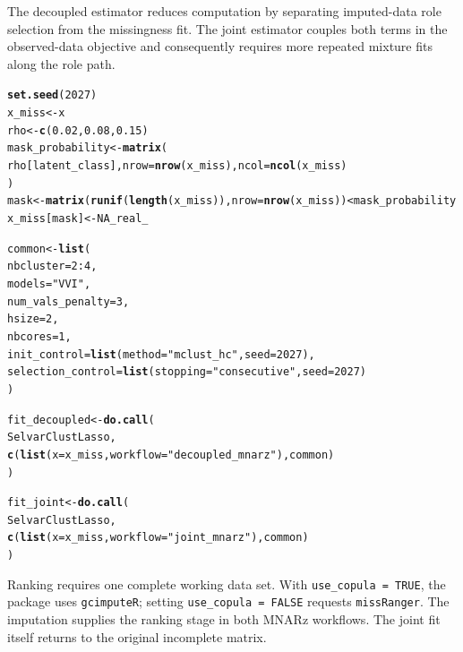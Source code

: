 \documentclass[10pt]{article}\usepackage[]{graphicx}\usepackage[]{xcolor}
\makeatletter
\newcommand{\hlnum}[1]{\textcolor[rgb]{0.686,0.059,0.569}{#1}}%
\newcommand{\hlsng}[1]{\textcolor[rgb]{0.192,0.494,0.8}{#1}}%
\newcommand{\hlopt}[1]{\textcolor[rgb]{0,0,0}{#1}}%
\newcommand{\hldef}[1]{\textcolor[rgb]{0.345,0.345,0.345}{#1}}%
\newcommand{\hlkwb}[1]{\textcolor[rgb]{0.69,0.353,0.396}{#1}}%
\newcommand{\hlkwc}[1]{\textcolor[rgb]{0.333,0.667,0.333}{#1}}%
\newcommand{\hlkwd}[1]{\textcolor[rgb]{0.737,0.353,0.396}{\textbf{#1}}}%
\newenvironment{kframe}{%
 \def\at@end@of@kframe{}%
 \ifinner\ifhmode%
  \def\at@end@of@kframe{\end{minipage}}%
  \begin{minipage}{\columnwidth}%
 \fi\fi%
 \def\FrameCommand##1{\hskip\@totalleftmargin \hskip-\fboxsep
 \colorbox{shadecolor}{##1}\hskip-\fboxsep
     \hskip-\linewidth \hskip-\@totalleftmargin \hskip\columnwidth}%
 \MakeFramed {\advance\hsize-\width
   \@totalleftmargin\z@ \linewidth\hsize
   \@setminipage}}%
 {\par\unskip\endMakeFramed%
 \at@end@of@kframe}
\newenvironment{knitrout}{}{} %
\makeatother
\begin{document}
The decoupled estimator reduces computation by separating imputed-data role
selection from the missingness fit. The joint estimator couples both terms in
the observed-data objective and consequently requires more repeated mixture
fits along the role path.

\begin{knitrout}
\color{fgcolor}\begin{kframe}
\begin{alltt}
\hlkwd{set.seed}\hldef{(}\hlnum{2027}\hldef{)}
\hldef{x_miss} \hlkwb{<-} \hldef{x}
\hldef{rho} \hlkwb{<-} \hlkwd{c}\hldef{(}\hlnum{0.02}\hldef{,} \hlnum{0.08}\hldef{,} \hlnum{0.15}\hldef{)}
\hldef{mask_probability} \hlkwb{<-} \hlkwd{matrix}\hldef{(}
 \hldef{rho[latent_class],} \hlkwc{nrow} \hldef{=} \hlkwd{nrow}\hldef{(x_miss),} \hlkwc{ncol} \hldef{=} \hlkwd{ncol}\hldef{(x_miss)}
\hldef{)}
\hldef{mask} \hlkwb{<-} \hlkwd{matrix}\hldef{(}\hlkwd{runif}\hldef{(}\hlkwd{length}\hldef{(x_miss)),} \hlkwc{nrow} \hldef{=} \hlkwd{nrow}\hldef{(x_miss))} \hlopt{<} \hldef{mask_probability}
\hldef{x_miss[mask]} \hlkwb{<-} \hlnum{NA_real_}

\hldef{common} \hlkwb{<-} \hlkwd{list}\hldef{(}
 \hlkwc{nbcluster} \hldef{=} \hlnum{2}\hlopt{:}\hlnum{4}\hldef{,}
 \hlkwc{models} \hldef{=} \hlsng{"VVI"}\hldef{,}
 \hlkwc{num_vals_penalty} \hldef{=} \hlnum{3}\hldef{,}
 \hlkwc{hsize} \hldef{=} \hlnum{2}\hldef{,}
 \hlkwc{nbcores} \hldef{=} \hlnum{1}\hldef{,}
 \hlkwc{init_control} \hldef{=} \hlkwd{list}\hldef{(}\hlkwc{method} \hldef{=} \hlsng{"mclust_hc"}\hldef{,} \hlkwc{seed} \hldef{=} \hlnum{2027}\hldef{),}
 \hlkwc{selection_control} \hldef{=} \hlkwd{list}\hldef{(}\hlkwc{stopping} \hldef{=} \hlsng{"consecutive"}\hldef{,} \hlkwc{seed} \hldef{=} \hlnum{2027}\hldef{)}
\hldef{)}

\hldef{fit_decoupled} \hlkwb{<-} \hlkwd{do.call}\hldef{(}
 \hldef{SelvarClustLasso,}
 \hlkwd{c}\hldef{(}\hlkwd{list}\hldef{(}\hlkwc{x} \hldef{= x_miss,} \hlkwc{workflow} \hldef{=} \hlsng{"decoupled_mnarz"}\hldef{), common)}
\hldef{)}

\hldef{fit_joint} \hlkwb{<-} \hlkwd{do.call}\hldef{(}
 \hldef{SelvarClustLasso,}
 \hlkwd{c}\hldef{(}\hlkwd{list}\hldef{(}\hlkwc{x} \hldef{= x_miss,} \hlkwc{workflow} \hldef{=} \hlsng{"joint_mnarz"}\hldef{), common)}
\hldef{)}
\end{alltt}
\end{kframe}
\end{knitrout}

Ranking requires one complete working data set. With
\texttt{use\_copula = TRUE}, the package uses \texttt{gcimputeR}; setting
\texttt{use\_copula = FALSE} requests \texttt{missRanger}. The imputation
supplies the ranking stage in both MNARz workflows. The joint fit itself
returns to the original incomplete matrix.
\end{document}
